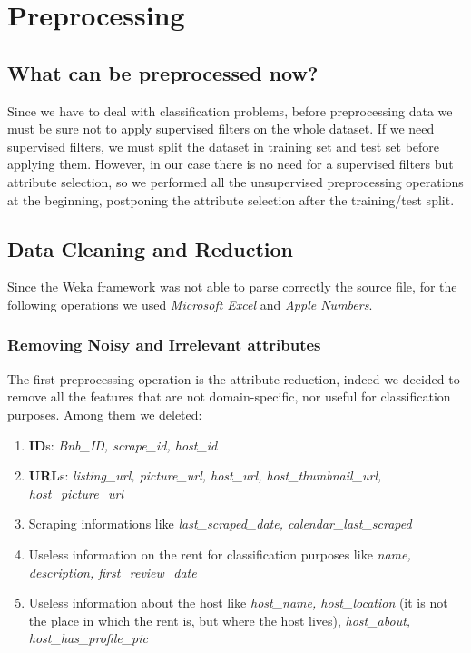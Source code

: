 \section{Preprocessing}

\subsection{What can be preprocessed now?}
Since we have to deal with classification problems, before preprocessing data we must be sure not to apply supervised filters on the whole dataset. If we need supervised filters, we must split the dataset in training set and test set before applying them. However, in our case there is no need for a supervised filters but  attribute selection, so we performed all the unsupervised preprocessing operations at the beginning, postponing the attribute selection after the training/test split.

\subsection{Data Cleaning and Reduction}
Since the Weka framework was not able to parse correctly the source file, for the following operations we used \textit{Microsoft Excel} and \textit{Apple Numbers}.

\subsubsection{Removing Noisy and Irrelevant attributes}
The first preprocessing operation is the attribute reduction, indeed we decided to remove all the features that are not domain-specific, nor useful for classification purposes. Among them we deleted:

\begin{enumerate}
	\item \textbf{ID}s: \textit{Bnb\_ID, scrape\_id, host\_id}
	\item \textbf{URL}s: \textit{listing\_url, picture\_url, host\_url, host\_thumbnail\_url, host\_picture\_url}
	\item Scraping informations like \textit{last\_scraped\_date, calendar\_last\_scraped}
	\item Useless information on the rent for classification purposes like \textit{name, description, first\_review\_date}
	\item Useless information about the host like \textit{host\_name, host\_location} (it is not the place in which the rent is, but where the host lives), \textit{host\_about, host\_has\_profile\_pic}
\end{enumerate}

